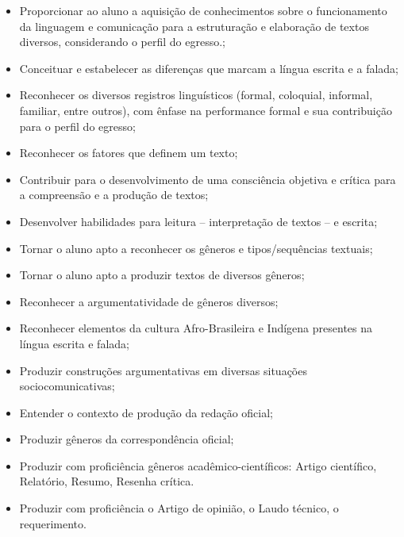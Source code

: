 \begin{itemize}

\item Proporcionar ao aluno a aquisição de conhecimentos sobre o funcionamento da linguagem e comunicação para a estruturação e elaboração de textos diversos, considerando o perfil do egresso.;
\item Conceituar e estabelecer as diferenças que marcam a língua escrita e a falada;
\item Reconhecer os diversos registros linguísticos (formal, coloquial, informal, familiar, entre outros), com ênfase na performance formal e sua contribuição para o perfil do egresso;
\item Reconhecer os fatores que definem um texto;
\item Contribuir para o desenvolvimento de uma consciência objetiva e crítica para a compreensão e a produção de textos;
\item Desenvolver habilidades para leitura – interpretação de textos – e escrita;
\item Tornar o aluno apto a reconhecer os gêneros e tipos/sequências textuais;
\item Tornar o aluno apto a produzir textos de diversos gêneros;
\item Reconhecer a argumentatividade de gêneros diversos;
\item Reconhecer elementos da cultura Afro-Brasileira e Indígena presentes na língua escrita e falada;
\item Produzir construções argumentativas em diversas situações sociocomunicativas;
\item Entender o contexto de produção da redação oficial;
\item Produzir gêneros da correspondência oficial;
\item Produzir com proficiência gêneros acadêmico-científicos: Artigo científico, Relatório, Resumo, Resenha crítica.
\item Produzir com proficiência o Artigo de opinião, o Laudo técnico, o requerimento.

\end{itemize} 




